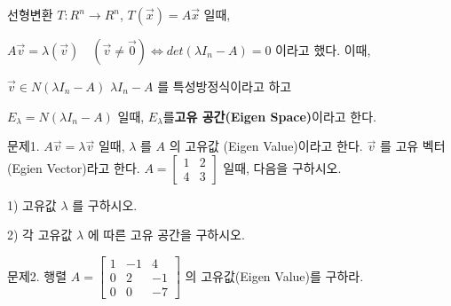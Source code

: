 \begin{definition} 
선형변환 $T: R^n \rightarrow R^n$,   $T(\vec{x}) = A\vec{x}$ 일때,

$A\vec{v} = \lambda(\vec{v}) \quad (\vec{v} \neq \vec{0}) \iff det(\lambda I_n - A) = 0$ 이라고 했다. 이때,

$\vec{v} \in N(\lambda I_n - A)$  $\lambda I_n - A$ 를 특성방정식이라고 하고 

$E_\lambda = N(\lambda I_n - A)$ 일때, $E_\lambda$를\textbf{고유 공간(Eigen Space)}이라고 한다.
\end{definition}

\newpage
문제1. $A\vec{v} = \lambda\vec{v}$ 일때, $\lambda$ 를 $A$ 의 고유값 (Eigen Value)이라고 한다. $\vec{v}$ 를 고유 벡터 (Egien Vector)라고 한다. $A = \begin{bmatrix} 1 & 2 \\ 4 & 3 \end{bmatrix}$ 일때, 다음을 구하시오.

1) 고유값 $\lambda$ 를 구하시오.

2) 각 고유값 $\lambda$ 에 따른 고유 공간을 구하시오.



문제2. 행렬 $A=\begin{bmatrix}1 & -1 & 4 \\ 0 & 2 & -1 \\ 0 &0 & -7 \end{bmatrix}$ 의 고유값(Eigen Value)를 구하라.